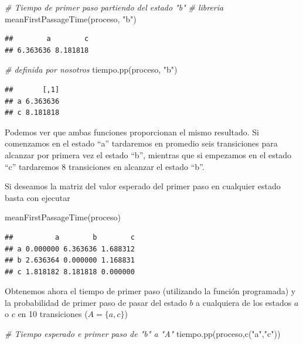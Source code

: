 \documentclass[
]{book}
\newenvironment{Shaded}{\begin{snugshade}}{\end{snugshade}}
\newcommand{\CommentTok}[1]{\textcolor[rgb]{0.56,0.35,0.01}{\textit{#1}}}
\newcommand{\FunctionTok}[1]{\textcolor[rgb]{0.00,0.00,0.00}{#1}}
\newcommand{\NormalTok}[1]{#1}
\newcommand{\StringTok}[1]{\textcolor[rgb]{0.31,0.60,0.02}{#1}}
\theoremstyle{definition}
\theoremstyle{definition}
\theoremstyle{definition}
\theoremstyle{definition}
\theoremstyle{remark}
\begin{document}
\begin{Shaded}
\begin{Highlighting}[]
\CommentTok{\# Tiempo de primer paso partiendo del estado "b"}
\CommentTok{\# libreria}
\FunctionTok{meanFirstPassageTime}\NormalTok{(proceso, }\StringTok{"b"}\NormalTok{)}
\end{Highlighting}
\end{Shaded}

\begin{verbatim}
##        a        c 
## 6.363636 8.181818
\end{verbatim}

\begin{Shaded}
\begin{Highlighting}[]
\CommentTok{\# definida por nosotros}
\FunctionTok{tiempo.pp}\NormalTok{(proceso, }\StringTok{"b"}\NormalTok{)}
\end{Highlighting}
\end{Shaded}

\begin{verbatim}
##       [,1]
## a 6.363636
## c 8.181818
\end{verbatim}

Podemos ver que ambas funciones proporcionan el mismo resultado. Si comenzamos en el estado ``a'' tardaremos en promedio seis transiciones para alcanzar por primera vez el estado ``b'', mientras que si empezamos en el estado ``c'' tardaremos 8 transiciones en alcanzar el estado ``b''.

Si deseamos la matriz del valor esperado del primer paso en cualquier estado basta con ejecutar

\begin{Shaded}
\begin{Highlighting}[]
\FunctionTok{meanFirstPassageTime}\NormalTok{(proceso)}
\end{Highlighting}
\end{Shaded}

\begin{verbatim}
##          a        b        c
## a 0.000000 6.363636 1.688312
## b 2.636364 0.000000 1.168831
## c 1.818182 8.181818 0.000000
\end{verbatim}

Obtenemos ahora el tiempo de primer paso (utilizando la función programada) y la probabilidad de primer paso de pasar del estado \(b\) a cualquiera de los estados \(a\) o \(c\) en 10 transiciones (\(A = \{a, c\}\))

\begin{Shaded}
\begin{Highlighting}[]
\CommentTok{\# Tiempo esperado e primer paso de "b" a "A"}
\FunctionTok{tiempo.pp}\NormalTok{(proceso,}\FunctionTok{c}\NormalTok{(}\StringTok{"a"}\NormalTok{,}\StringTok{"c"}\NormalTok{))}
\end{Highlighting}
\end{Shaded}
\end{document}
